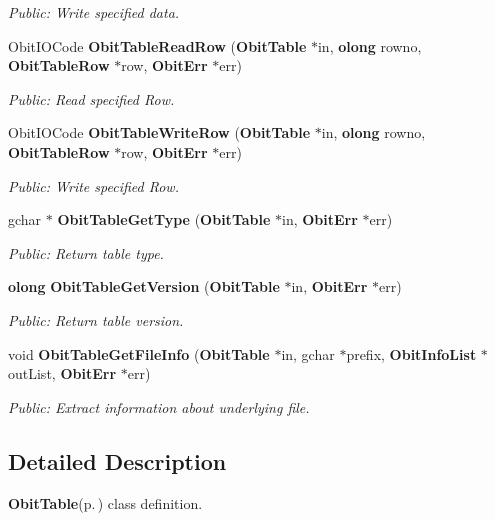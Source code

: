 \begin{CompactItemize}
\begin{CompactList}\small\item\em Public: Write specified data. \item\end{CompactList}\item 
Obit\-IOCode {\bf Obit\-Table\-Read\-Row} ({\bf Obit\-Table} $\ast$in, {\bf olong} rowno, {\bf Obit\-Table\-Row} $\ast$row, {\bf Obit\-Err} $\ast$err)
\begin{CompactList}\small\item\em Public: Read specified Row. \item\end{CompactList}\item 
Obit\-IOCode {\bf Obit\-Table\-Write\-Row} ({\bf Obit\-Table} $\ast$in, {\bf olong} rowno, {\bf Obit\-Table\-Row} $\ast$row, {\bf Obit\-Err} $\ast$err)
\begin{CompactList}\small\item\em Public: Write specified Row. \item\end{CompactList}\item 
gchar $\ast$ {\bf Obit\-Table\-Get\-Type} ({\bf Obit\-Table} $\ast$in, {\bf Obit\-Err} $\ast$err)
\begin{CompactList}\small\item\em Public: Return table type. \item\end{CompactList}\item 
{\bf olong} {\bf Obit\-Table\-Get\-Version} ({\bf Obit\-Table} $\ast$in, {\bf Obit\-Err} $\ast$err)
\begin{CompactList}\small\item\em Public: Return table version. \item\end{CompactList}\item 
void {\bf Obit\-Table\-Get\-File\-Info} ({\bf Obit\-Table} $\ast$in, gchar $\ast$prefix, {\bf Obit\-Info\-List} $\ast$out\-List, {\bf Obit\-Err} $\ast$err)
\begin{CompactList}\small\item\em Public: Extract information about underlying file. \item\end{CompactList}\end{CompactItemize}


\subsection{Detailed Description}
{\bf Obit\-Table}{\rm (p.\,\pageref{structObitTable})} class definition. 

